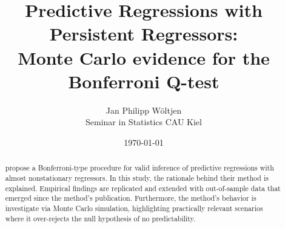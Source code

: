 \documentclass{article}
\title{Predictive Regressions with Persistent Regressors:\\ Monte Carlo evidence for the Bonferroni Q-test}
\author{Jan Philipp Wöltjen  \\
	Seminar in Statistics CAU Kiel  \\
	}
\date{\today}
\begin{document}
\maketitle


\begin{abstract}
\citet{campbell2006efficient} propose a Bonferroni-type procedure for valid inference of predictive regressions with almost nonstationary regressors. In this study, the rationale behind their method is explained. Empirical findings are replicated and extended with out-of-sample data that emerged since the method's publication. Furthermore, the method's behavior is investigate via Monte Carlo simulation, highlighting practically relevant scenarios where it over-rejects the null hypothesis of no predictability. 
\end{abstract}
\end{document}

